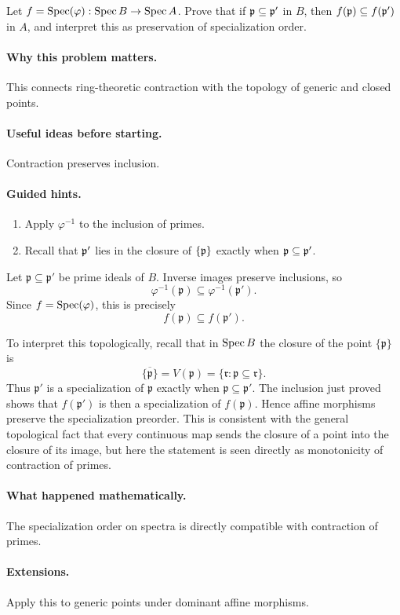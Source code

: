 \begin{problem}\label{prob:vi19-p18}
Let $f=\operatorname{Spec}(\varphi):\operatorname{Spec} B\to\operatorname{Spec} A$. Prove that if $\mathfrak p\subseteq\mathfrak p'$ in $B$, then $f(\mathfrak p)\subseteq f(\mathfrak p')$ in $A$, and interpret this as preservation of specialization order.
\end{problem}

\ifdefined\FullProblemDossiers
\paragraph{Why this problem matters.}
This connects ring-theoretic contraction with the topology of generic and closed points.

\paragraph{Useful ideas before starting.}
Contraction preserves inclusion.

\paragraph{Guided hints.}
\begin{enumerate}
\item Apply $\varphi^{-1}$ to the inclusion of primes.
\item Recall that $\mathfrak p' $ lies in the closure of $\{\mathfrak p\}$ exactly when $\mathfrak p\subseteq\mathfrak p'$.
\end{enumerate}

\begin{solution}
Let \(\mathfrak p\subseteq\mathfrak p'\) be prime ideals of \(B\).  Inverse images preserve inclusions, so
\[
\varphi^{-1}(\mathfrak p)
\subseteq
\varphi^{-1}(\mathfrak p').
\]
Since \(f=\operatorname{Spec}(\varphi)\), this is precisely
\[
f(\mathfrak p)\subseteq f(\mathfrak p').
\]

To interpret this topologically, recall that in \(\operatorname{Spec} B\) the closure of the point \(\{\mathfrak p\}\) is
\[
\overline{\{\mathfrak p\}}=V(\mathfrak p)
=\{\mathfrak r:\mathfrak p\subseteq\mathfrak r\}.
\]
Thus \(\mathfrak p'\) is a specialization of \(\mathfrak p\) exactly when \(\mathfrak p\subseteq\mathfrak p'\).  The inclusion just proved shows that \(f(\mathfrak p')\) is then a specialization of \(f(\mathfrak p)\).  Hence affine morphisms preserve the specialization preorder.  This is consistent with the general topological fact that every continuous map sends the closure of a point into the closure of its image, but here the statement is seen directly as monotonicity of contraction of primes.
\end{solution}

\paragraph{What happened mathematically.}
The specialization order on spectra is directly compatible with contraction of primes.

\paragraph{Extensions.}
Apply this to generic points under dominant affine morphisms.
\fi
